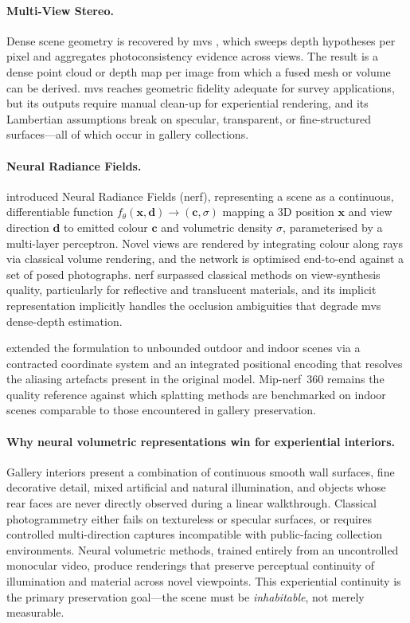 \paragraph{Multi-View Stereo.}
Dense scene geometry is recovered by \acrlong{mvs}
\parencite{Schoenberger2016mvs}, which sweeps depth hypotheses per pixel and
aggregates photoconsistency evidence across views. The result is a dense point
cloud or depth map per image from which a fused mesh or volume can be derived.
\acrshort{mvs} reaches geometric fidelity adequate for survey applications, but
its outputs require manual clean-up for experiential rendering, and its Lambertian
assumptions break on specular, transparent, or fine-structured surfaces---all of
which occur in gallery collections.

\paragraph{Neural Radiance Fields.}
\textcite{Mildenhall2020} introduced Neural Radiance Fields (\acrshort{nerf}),
representing a scene as a continuous, differentiable function
$f_\theta(\mathbf{x}, \mathbf{d}) \to (\mathbf{c}, \sigma)$ mapping a 3D position
$\mathbf{x}$ and view direction $\mathbf{d}$ to emitted colour $\mathbf{c}$ and
volumetric density $\sigma$, parameterised by a multi-layer perceptron. Novel views
are rendered by integrating colour along rays via classical volume rendering, and
the network is optimised end-to-end against a set of posed photographs.
\acrshort{nerf} surpassed classical methods on view-synthesis quality, particularly
for reflective and translucent materials, and its implicit representation implicitly
handles the occlusion ambiguities that degrade \acrshort{mvs} dense-depth estimation.

\textcite{Barron2022MipNeRF360} extended the formulation to unbounded outdoor and
indoor scenes via a contracted coordinate system and an integrated positional
encoding that resolves the aliasing artefacts present in the original model.
Mip-\acrshort{nerf}~360 remains the quality reference against which splatting
methods are benchmarked on indoor scenes comparable to those encountered in
gallery preservation.

\paragraph{Why neural volumetric representations win for experiential interiors.}
Gallery interiors present a combination of continuous smooth wall surfaces, fine
decorative detail, mixed artificial and natural illumination, and objects whose
rear faces are never directly observed during a linear walkthrough. Classical
photogrammetry either fails on textureless or specular surfaces, or requires
controlled multi-direction captures incompatible with public-facing collection
environments. Neural volumetric methods, trained entirely from an uncontrolled
monocular video, produce renderings that preserve perceptual continuity of
illumination and material across novel viewpoints. This experiential continuity
is the primary preservation goal---the scene must be \emph{inhabitable}, not merely
measurable.

